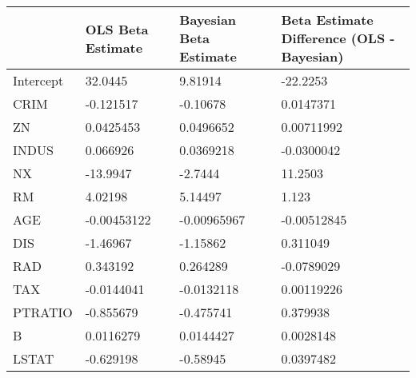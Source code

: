 \begin{tabular}{llll}
\hline
           & OLS Beta Estimate   & Bayesian Beta Estimate   & Beta Estimate Difference (OLS - Bayesian)   \\
\hline
 Intercept & 32.0445             & 9.81914                  & -22.2253                                    \\
 CRIM      & -0.121517           & -0.10678                 & 0.0147371                                   \\
 ZN        & 0.0425453           & 0.0496652                & 0.00711992                                  \\
 INDUS     & 0.066926            & 0.0369218                & -0.0300042                                  \\
 NX        & -13.9947            & -2.7444                  & 11.2503                                     \\
 RM        & 4.02198             & 5.14497                  & 1.123                                       \\
 AGE       & -0.00453122         & -0.00965967              & -0.00512845                                 \\
 DIS       & -1.46967            & -1.15862                 & 0.311049                                    \\
 RAD       & 0.343192            & 0.264289                 & -0.0789029                                  \\
 TAX       & -0.0144041          & -0.0132118               & 0.00119226                                  \\
 PTRATIO   & -0.855679           & -0.475741                & 0.379938                                    \\
 B         & 0.0116279           & 0.0144427                & 0.0028148                                   \\
 LSTAT     & -0.629198           & -0.58945                 & 0.0397482                                   \\
\hline
\end{tabular}